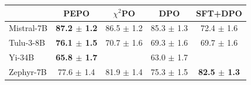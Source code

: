 \small
\begin{tabular}{lcccc}
\toprule
 & PEPO & $\chi^2$PO & DPO & SFT+DPO \\
\midrule
Mistral-7B & \textbf{87.2 $\pm$ 1.2} & 86.5 $\pm$ 1.2 & 85.3 $\pm$ 1.3 & 72.4 $\pm$ 1.6 \\
Tulu-3-8B & \textbf{76.1 $\pm$ 1.5} & 70.7 $\pm$ 1.6 & 69.3 $\pm$ 1.6 & 69.7 $\pm$ 1.6 \\
Yi-34B & \textbf{65.8 $\pm$ 1.7} &  & 63.0 $\pm$ 1.7 &  \\
Zephyr-7B & 77.6 $\pm$ 1.4 & 81.9 $\pm$ 1.4 & 75.3 $\pm$ 1.5 & \textbf{82.5 $\pm$ 1.3} \\
\bottomrule
\end{tabular}

